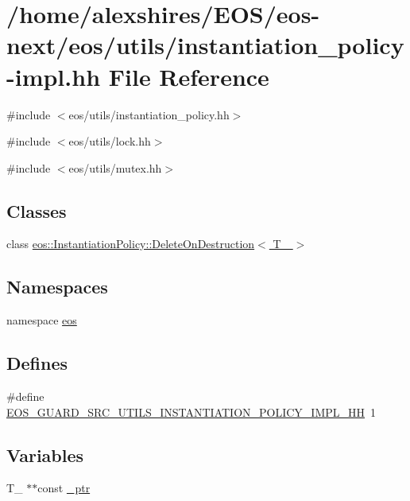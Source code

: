 \hypertarget{instantiation__policy-impl_8hh}{
\section{/home/alexshires/EOS/eos-\/next/eos/utils/instantiation\_\-policy-\/impl.hh File Reference}
\label{instantiation__policy-impl_8hh}
}
{\ttfamily \#include $<$eos/utils/instantiation\_\-policy.hh$>$}\par
{\ttfamily \#include $<$eos/utils/lock.hh$>$}\par
{\ttfamily \#include $<$eos/utils/mutex.hh$>$}\par
\subsection*{Classes}
\begin{DoxyCompactItemize}
\item 
class \hyperlink{classeos_1_1InstantiationPolicy_1_1DeleteOnDestruction}{eos::InstantiationPolicy::DeleteOnDestruction$<$ T\_\- $>$}
\end{DoxyCompactItemize}
\subsection*{Namespaces}
\begin{DoxyCompactItemize}
\item 
namespace \hyperlink{namespaceeos}{eos}
\end{DoxyCompactItemize}
\subsection*{Defines}
\begin{DoxyCompactItemize}
\item 
\#define \hyperlink{instantiation__policy-impl_8hh_ae2d6dcc9b4b13eb782bfb6b6763ef2d1}{EOS\_\-GUARD\_\-SRC\_\-UTILS\_\-INSTANTIATION\_\-POLICY\_\-IMPL\_\-HH}~1
\end{DoxyCompactItemize}
\subsection*{Variables}
\begin{DoxyCompactItemize}
\item 
T\_\- $\ast$$\ast$const \hyperlink{instantiation__policy-impl_8hh_a8d520b2d8f25a7b950b519d090c05683}{\_\-ptr}
\end{DoxyCompactItemize}


